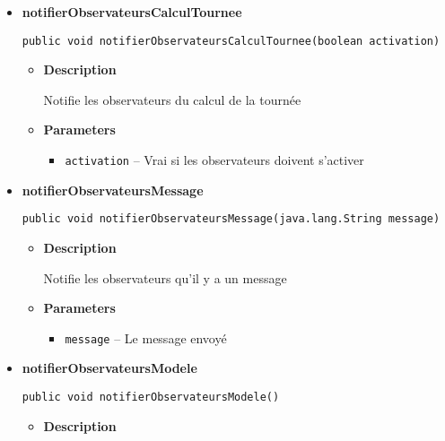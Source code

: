 \documentclass[11pt,a4paper]{report}
\begin{document}
{{{{{{\begin{itemize}
{\begin{itemize}
{Notifie les observateurs qu'il y a eu une annulation
}
\item{
{\bf  Parameters}
  \begin{itemize}
   \item{
\texttt{activation} -- Vrai si les observateurs doivent s'activer dans ce cas d'annulation}
  \end{itemize}
}%
\end{itemize}
}%
\item{ 
\hypertarget{controleur.ControleurDonnees.notifierObservateursCalculTournee(boolean)}{{\bf  notifierObservateursCalculTournee}\\}
\begin{lstlisting}[frame=none]
public void notifierObservateursCalculTournee(boolean activation)\end{lstlisting} %
\begin{itemize}
\item{
{\bf  Description}

Notifie les observateurs du calcul de la tournée
}
\item{
{\bf  Parameters}
  \begin{itemize}
   \item{
\texttt{activation} -- Vrai si les observateurs doivent s'activer}
  \end{itemize}
}%
\end{itemize}
}%
\item{ 
\hypertarget{controleur.ControleurDonnees.notifierObservateursMessage(java.lang.String)}{{\bf  notifierObservateursMessage}\\}
\begin{lstlisting}[frame=none]
public void notifierObservateursMessage(java.lang.String message)\end{lstlisting} %
\begin{itemize}
\item{
{\bf  Description}

Notifie les observateurs qu'il y a un message
}
\item{
{\bf  Parameters}
  \begin{itemize}
   \item{
\texttt{message} -- Le message envoyé}
  \end{itemize}
}%
\end{itemize}
}%
\item{ 
\hypertarget{controleur.ControleurDonnees.notifierObservateursModele()}{{\bf  notifierObservateursModele}\\}
\begin{lstlisting}[frame=none]
public void notifierObservateursModele()\end{lstlisting} %
\begin{itemize}
\item{
{\bf  Description}

}
\end{itemize}}
\end{itemize}}}}}}}
\end{document}

